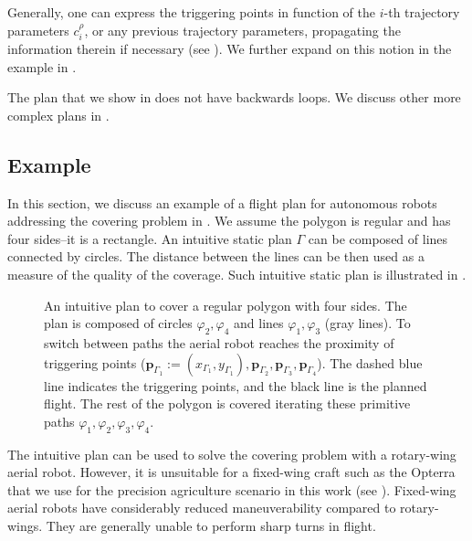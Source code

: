 Generally, one can express the triggering points in function of the $i$-th trajectory parameters $c_{i}^{\rho}$, or any previous trajectory parameters, propagating the information therein if necessary (see ). We further expand on this notion in the example in .

The plan that we show in  does not have backwards loops. We discuss other more complex plans in . 

\subsection{Example}
\label{sec:flight-plan}

In this section, we discuss an example of a flight plan for autonomous robots addressing the covering problem in . We assume the polygon is regular and has four sides--it is a rectangle. An intuitive static plan $\Gamma$ can be composed of lines connected by circles. The distance between the lines can be then used as a measure of the quality of the coverage. Such intuitive static plan is illustrated in .

\begin{figure}[t]
  \centering
  
  \caption[Intuitive plan to cover a regular polygon with four sides]{An intuitive plan to cover a regular polygon with four sides. The plan is composed of circles $\varphi_2,\varphi_4$ and lines $\varphi_1,\varphi_3$ (gray lines). To switch between paths the aerial robot reaches the proximity of triggering points ($\mathbf{p}_{\Gamma_1}:=(x_{\Gamma_1},y_{\Gamma_1}),\mathbf{p}_{\Gamma_2},\mathbf{p}_{\Gamma_3},\mathbf{p}_{\Gamma_4}$). The dashed blue line indicates the triggering points, and the black line is the planned flight. The rest of the polygon is covered iterating these primitive paths $\varphi_1,\varphi_2,\varphi_3,\varphi_4$.}
  \label{fig:plot3}
\end{figure}

The intuitive plan can be used to solve the covering problem with a rotary-wing aerial robot. However, it is unsuitable for a fixed-wing craft such as the Opterra that we use for the precision agriculture scenario in this work (see ). Fixed-wing aerial robots have considerably reduced maneuverability compared to rotary-wings. They are generally unable to perform sharp turns in flight.

